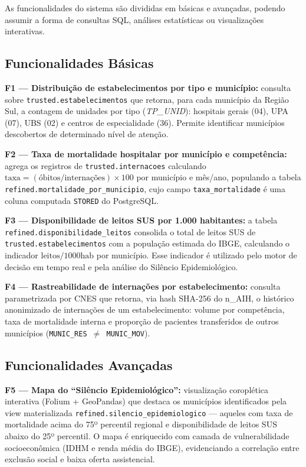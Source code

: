 \documentclass[12pt]{article}
\begin{document}
As funcionalidades do sistema são divididas em básicas e avançadas, podendo
assumir a forma de consultas SQL, análises estatísticas ou visualizações
interativas.

\subsection{Funcionalidades Básicas}

\textbf{F1 — Distribuição de estabelecimentos por tipo e município:}
consulta sobre \texttt{trusted.estabelecimentos} que retorna, para cada
município da Região Sul, a contagem de unidades por tipo (\textit{TP\_UNID}):
hospitais gerais (04), UPA (07), UBS (02) e centros de especialidade (36).
Permite identificar municípios descobertos de determinado nível de atenção.

\textbf{F2 — Taxa de mortalidade hospitalar por município e competência:}
agrega os registros de \texttt{trusted.internacoes} calculando
$\text{taxa} = (\text{óbitos} / \text{internações}) \times 100$ por município
e mês/ano, populando a tabela \texttt{refined.mortalidade\_por\_municipio},
cujo campo \texttt{taxa\_mortalidade} é uma coluna computada \texttt{STORED}
do PostgreSQL.

\textbf{F3 — Disponibilidade de leitos SUS por 1.000 habitantes:}
a tabela \texttt{refined.disponibilidade\_leitos} consolida o total de leitos
SUS de \texttt{trusted.estabelecimentos} com a população estimada do IBGE,
calculando o indicador $\text{leitos}/1000\text{hab}$ por município. Esse
indicador é utilizado pelo motor de decisão em tempo real e pela análise do
Silêncio Epidemiológico.

\textbf{F4 — Rastreabilidade de internações por estabelecimento:}
consulta parametrizada por CNES que retorna, via hash SHA-256 do n\_AIH, o
histórico anonimizado de internações de um estabelecimento: volume por
competência, taxa de mortalidade interna e proporção de pacientes transferidos
de outros municípios (\texttt{MUNIC\_RES $\neq$ MUNIC\_MOV}).

\subsection{Funcionalidades Avançadas}

\textbf{F5 — Mapa do ``Silêncio Epidemiológico'':}
visualização coroplética interativa (Folium + GeoPandas) que destaca os
municípios identificados pela view materializada
\texttt{refined.silencio\_epidemiologico} — aqueles com taxa de mortalidade
acima do 75º percentil regional e disponibilidade de leitos SUS abaixo do
25º percentil. O mapa é enriquecido com camada de vulnerabilidade
socioeconômica (IDHM e renda média do IBGE), evidenciando a correlação entre
exclusão social e baixa oferta assistencial.
\end{document}
